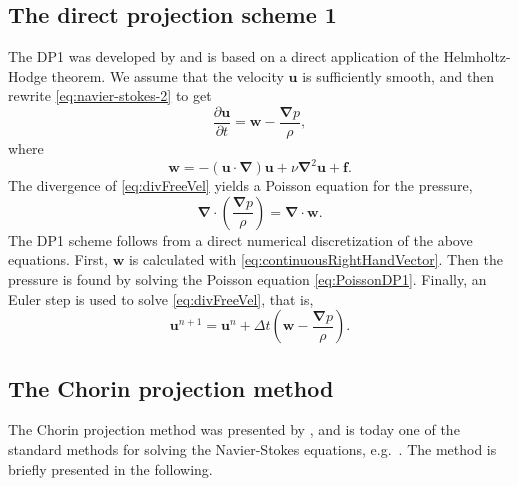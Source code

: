 \documentclass[11pt,b5paper,DIV=calc,BCOR1.3cm,headings=small,%
               footinclude=false,headsepline]{scrbook}
\newcommand*{\pdt}[1]{\ensuremath{\frac{\partial #1}{\partial t}}}
\newcommand*{\vct}[1]{\ensuremath{\boldsymbol{#1}}}
\newcommand*{\del}{\boldsymbol\nabla}
\renewcommand*{\div}{\del\cdot}
\newcommand*{\grad}{\del}
\begin{document}
\subsection{The direct projection scheme 1}
The DP1 was developed by \citet{Hansen05} and is based on a direct application
of the Helmholtz-Hodge theorem.  We assume that the velocity $\vct u$ is
sufficiently smooth, and then rewrite \eqref{eq:navier-stokes-2} to get
\begin{equation}
  \label{eq:divFreeVel}
  \pdt{\vct u} = \vct w - \frac{\grad p}{\rho},
\end{equation}
where
\begin{equation}
  \vct w = - (\vct u\cdot\grad)\vct u + \nu\grad^2\vct u + \vct f.
  \label{eq:continuousRightHandVector}
\end{equation}
The divergence of \eqref{eq:divFreeVel} yields a Poisson equation for the
pressure,
\begin{equation}
  \div\left(\frac{\grad p}{\rho}\right) = \div\vct w.
  \label{eq:PoissonDP1}
\end{equation}
The DP1 scheme follows from a direct numerical discretization of the above
equations.  First, $\vct w$ is calculated with
\eqref{eq:continuousRightHandVector}.  Then the pressure is found by solving
the Poisson equation \eqref{eq:PoissonDP1}.  Finally, an Euler step is used to
solve \eqref{eq:divFreeVel}, that is,
\begin{equation}
  \vct u^{n+1} = \vct u^n + \Delta t\left(\vct w - \frac{\grad p}{\rho}\right).
  \label{eq:dp1-update}
\end{equation}

\subsection{The Chorin projection method}
The Chorin projection method was presented by \citet{Chorin68}, and is today
one of the standard methods for solving the Navier-Stokes equations, e.g.\
\cite{Walker12}.  The method is briefly presented in the following.
\end{document}

